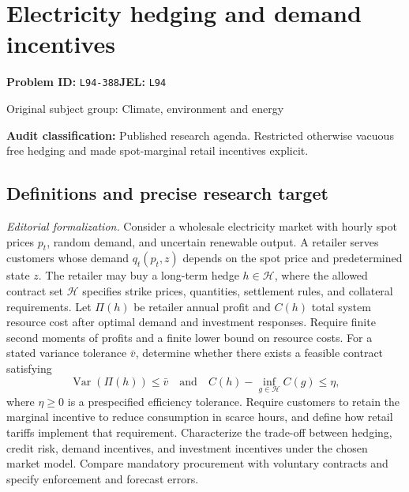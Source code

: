 \documentclass[11pt,a4paper]{article}
\begin{document}
\section*{Electricity hedging and demand incentives}
\textbf{Problem ID:} \texttt{L94-388}\quad \textbf{JEL:} \texttt{L94}\par
\label{problem:OP-0438}
{\sffamily\small\color{muted}Original subject group: Climate, environment and energy\par}
\label{definitions:problem:30007720}
\textbf{Audit classification:} Published research agenda. Restricted otherwise vacuous free hedging and made spot-marginal retail incentives explicit.
\subsection*{Definitions and precise research target}
\textit{Editorial formalization.} Consider a wholesale electricity market with hourly spot prices \(p_t\), random demand, and uncertain renewable output. A retailer serves customers whose demand \(q_t(p_t,z)\) depends on the spot price and predetermined state \(z\). The retailer may buy a long-term hedge \(h\in\mathcal H\), where the allowed contract set \(\mathcal H\) specifies strike prices, quantities, settlement rules, and collateral requirements. Let \(\Pi(h)\) be retailer annual profit and \(C(h)\) total system resource cost after optimal demand and investment responses. Require finite second moments of profits and a finite lower bound on resource costs. For a stated variance tolerance \(\bar v\), determine whether there exists a feasible contract satisfying
\[\operatorname{Var}(\Pi(h))\leq\bar v\quad\text{and}\quad C(h)-\inf_{g\in\mathcal H}C(g)\leq\eta,\]
where \(\eta\geq0\) is a prespecified efficiency tolerance. Require customers to retain the marginal incentive to reduce consumption in scarce hours, and define how retail tariffs implement that requirement. Characterize the trade-off between hedging, credit risk, demand incentives, and investment incentives under the chosen market model. Compare mandatory procurement with voluntary contracts and specify enforcement and forecast errors.
\end{document}
